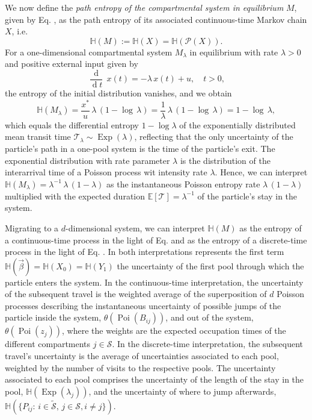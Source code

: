 \documentclass[smallextended]{svjour3}
\makeatletter
\renewcommand*{\eqref}[1]{%
  \hyperref[{#1}]{\textup{\tagform@{\ref*{#1}}}}%
}
\newcommand{\E}{\mathbb{E}}
\newcommand{\TT}{\mathcal{T}}
\renewcommand{\H}{\mathbb{H}}
\newcommand{\Exp}{\operatorname{Exp}}
\newcommand{\Poi}{\operatorname{Poi}}
\newcommand{\deriv}[1]{\frac{\operatorname{d}}{\operatorname{d}#1}}
\newcommand{\ie}{i.e.}
\makeatother
\begin{document}
We now define the \emph{path entropy of the compartmental system in equilibrium} $M$, given by Eq. \eqref{eqn:lin_CS_sys}, as the path entropy of its associated continuous-time Markov chain $X$, \ie
\begin{equation*}
  \H(M):=\H(X)=\H(\mathcal{P}(X)).
\end{equation*}
For a one-dimensional compartmental system $M_\lambda$ in equilibrium with rate $\lambda>0$ and positive external input given by
\begin{equation}
  \deriv{t}\,x(t) = -\lambda\,x(t) + u,\quad t>0,
\end{equation}
the entropy of the initial distribution vanishes, and we obtain
\begin{equation*}
  \H(M_\lambda) = \frac{x^\ast}{u}\,\lambda\,(1-\log\,\lambda) = \frac{1}{\lambda}\,\lambda\,(1-\log\,\lambda) = 1-\log\,\lambda,
\end{equation*}  
which equals the differential entropy $1-\log\lambda$ of the exponentially distributed mean transit time $\TT_\lambda\sim\Exp(\lambda)$, reflecting that the only uncertainty of the particle's path in a one-pool system is the time of the particle's exit.
The exponential distribution with rate parameter $\lambda$ is the distribution of the interarrival time of a Poisson process wit intensity rate $\lambda$.
Hence, we can interpret $\H(M_\lambda) = \lambda^{-1}\,\lambda\,(1-\lambda)$ as the instantaneous Poisson entropy rate $\lambda\,(1-\lambda)$ multiplied with the expected duration $\E\left[\TT\right]=\lambda^{-1}$ of the particle's stay in the system.

Migrating to a $d$-dimensional system, we can interpret $\H(M)$ as the entropy of a continuous-time process in the light of Eq. \eqref{eqn:H_occupation_time} and as the entropy of a discrete-time process in the light of Eq. \eqref{eqn:H_number_of_visits}.
In both interpretations represents the first term $\H(\vec{\beta})=\H(X_0)=\H(Y_1)$ the uncertainty of the first pool through which the particle enters the system.
In the continuous-time interpretation, the uncertainty of the subsequent travel is the weighted average of the superposition of $d$ Poisson processes describing the instantaneous uncertainty of possible jumps of the particle inside the system, $\theta(\Poi(B_{ij}))$, and out of the system, $\theta(\Poi(z_j))$, where the weights are the expected occupation times of the different compartments $j\in\mathcal{S}$. 
In the discrete-time interpretation, the subsequent travel's uncertainty is the average of uncertainties associated to each pool, weighted by the number of visits to the respective pools.
The uncertainty associated to each pool comprises the uncertainty of the length of the stay in the pool, $\H(\Exp(\lambda_j))$, and the uncertainty of where to jump afterwards, $\H(\{P_{ij}:\,i\in\widetilde{\mathcal{S}},\,j\in\mathcal{S},i\neq j\})$.
\end{document}
